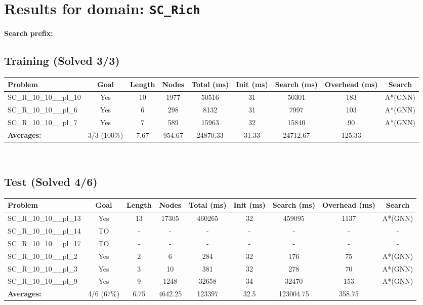 \documentclass{article}
\begin{document}
\section*{Results for domain: \texttt{SC\_Rich}}
\textbf{Search prefix:} 
\\[0.5cm]
\subsection*{Training (Solved 3/3)}
\begin{tabular}{lcccccccc}
\toprule
Problem & Goal & Length & Nodes & Total (ms) & Init (ms) & Search (ms) & Overhead (ms) & Search \\
\midrule
SC\_R\_10\_10\_\_pl\_10 & Yes & 10 & 1977 & 50516 & 31 & 50301 & 183 & A*(GNN) \\
SC\_R\_10\_10\_\_pl\_6 & Yes & 6 & 298 & 8132 & 31 & 7997 & 103 & A*(GNN) \\
SC\_R\_10\_10\_\_pl\_7 & Yes & 7 & 589 & 15963 & 32 & 15840 & 90 & A*(GNN) \\
\textbf{Averages:} & 3/3 (100\%) & 7.67 & 954.67 & 24870.33 & 31.33 & 24712.67 & 125.33 & \\
\bottomrule
\end{tabular}
\\[0.7cm]
\subsection*{Test (Solved 4/6)}
\begin{tabular}{lcccccccc}
\toprule
Problem & Goal & Length & Nodes & Total (ms) & Init (ms) & Search (ms) & Overhead (ms) & Search \\
\midrule
SC\_R\_10\_10\_\_pl\_13 & Yes & 13 & 17305 & 460265 & 32 & 459095 & 1137 & A*(GNN) \\
SC\_R\_10\_10\_\_pl\_14 & TO & - & - & - & - & - & - & - \\
SC\_R\_10\_10\_\_pl\_17 & TO & - & - & - & - & - & - & - \\
SC\_R\_10\_10\_\_pl\_2 & Yes & 2 & 6 & 284 & 32 & 176 & 75 & A*(GNN) \\
SC\_R\_10\_10\_\_pl\_3 & Yes & 3 & 10 & 381 & 32 & 278 & 70 & A*(GNN) \\
SC\_R\_10\_10\_\_pl\_9 & Yes & 9 & 1248 & 32658 & 34 & 32470 & 153 & A*(GNN) \\
\textbf{Averages:} & 4/6 (67\%) & 6.75 & 4642.25 & 123397 & 32.5 & 123004.75 & 358.75 & \\
\bottomrule
\end{tabular}
\\[0.7cm]
\end{document}
